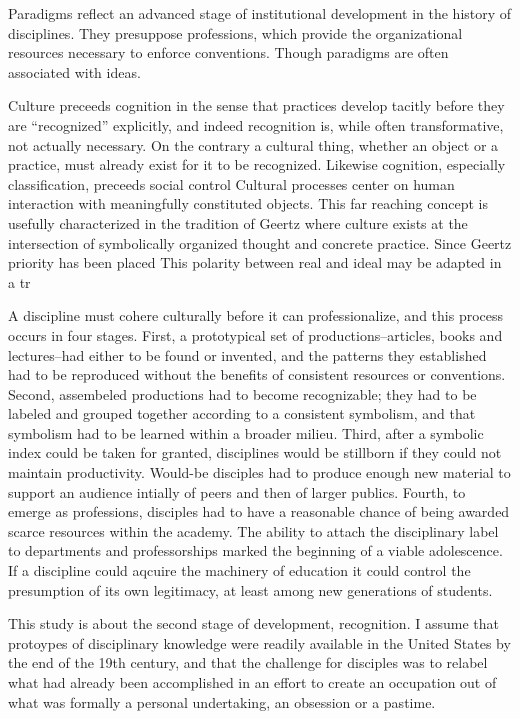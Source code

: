 \documentclass[]{article}
\begin{document}
Paradigms reflect an advanced stage of institutional development in the
history of disciplines. They presuppose professions, which provide the
organizational resources necessary to enforce conventions. Though
paradigms are often associated with ideas.

Culture preceeds cognition in the sense that practices develop tacitly
before they are ``recognized'' explicitly, and indeed recognition is,
while often transformative, not actually necessary. On the contrary a
cultural thing, whether an object or a practice, must already exist for
it to be recognized. Likewise cognition, especially classification,
preceeds social control Cultural processes center on human interaction
with meaningfully constituted objects. This far reaching concept is
usefully characterized in the tradition of Geertz where culture exists
at the intersection of symbolically organized thought and concrete
practice. Since Geertz priority has been placed This polarity between
real and ideal may be adapted in a tr

A discipline must cohere culturally before it can professionalize, and
this process occurs in four stages. First, a prototypical set of
productions--articles, books and lectures--had either to be found or
invented, and the patterns they established had to be reproduced without
the benefits of consistent resources or conventions. Second, assembeled
productions had to become recognizable; they had to be labeled and
grouped together according to a consistent symbolism, and that symbolism
had to be learned within a broader milieu. Third, after a symbolic index
could be taken for granted, disciplines would be stillborn if they could
not maintain productivity. Would-be disciples had to produce enough new
material to support an audience intially of peers and then of larger
publics. Fourth, to emerge as professions, disciples had to have a
reasonable chance of being awarded scarce resources within the academy.
The ability to attach the disciplinary label to departments and
professorships marked the beginning of a viable adolescence. If a
discipline could aqcuire the machinery of education it could control the
presumption of its own legitimacy, at least among new generations of
students.



This study is about the second stage of development, recognition. I
assume that protoypes of disciplinary knowledge were readily available
in the United States by the end of the 19th century, and that the
challenge for disciples was to relabel what had already been
accomplished in an effort to create an occupation out of what was
formally a personal undertaking, an obsession or a pastime.
\end{document}
